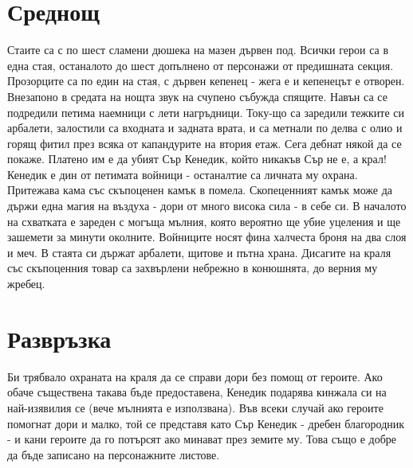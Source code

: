 \documentclass{article}
\begin{document}
\section{Среднощ}
Стаите са с по шест сламени дюшека на мазен дървен под.
Всички герои са в една стая, останалото до шест допълнено от персонажи от предишната секция.
Прозорците са по един на стая, с дървен кепенец - жега е и кепенецът е отворен.
Внезапоно в средата на нощта звук на счупено събужда спящите.
Навън са се подредили петима наемници с лети нагръдници.
Току-що са заредили тежките си арбалети, залостили са входната и задната врата, и са метнали по делва с олио и горящ фитил през всяка от капандурите на втория етаж.
Сега дебнат някой да се покаже.
Платено им е да убият Сър Кенедик, който никакъв Сър не е, а крал!
Кенедик е дин от петимата войници - останалтие са личната му охрана.
Притежава кама със скъпоценен камък в помела.
Скопеценният камък може да държи една магия на въздуха - дори от много висока сила - в себе си.
В началото на схватката е зареден с могъща мълния, която вероятно ще убие уцеления и ще зашемети за минути околните.
Войниците носят фина халчеста броня на два слоя и меч. В стаята си държат арбалети, щитове и пътна храна.
Дисагите на краля със скъпоценния товар са захвърлени небрежно в конюшнята, до верния му жребец.

\section{Развръзка}
Би трябвало охраната на краля да се справи дори без помощ от героите.
Ако обаче съществена такава бъде предоставена, Кенедик подарява кинжала си на най-изявилия се (вече мълнията е използвана).
Във всеки случай ако героите помогнат дори и малко, той се представя като Сър Кенедик - дребен благородник - и кани героите да го потърсят ако минават през земите му.
Това също е добре да бъде записано на персонажните листове.
\end{document}
